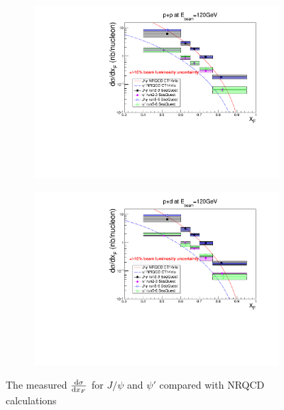 \documentclass[twocolumn,aps,unsortedaddress,superscriptaddress,prd,floatfix,showpacs,linenumbers]{revtex4-2}
\begin{document}
\begin{figure}
	\begin{subfigure}{0.45\linewidth}
		\includegraphics[width=\linewidth]{figures/crossSections/xF/combine_xF_LH2_5-6_5770_psip}
	\end{subfigure}
	\begin{subfigure}{0.45\linewidth}
		\includegraphics[width=\linewidth]{figures/crossSections/xF/combine_xF_LD2_5-6_5770_psip}
	\end{subfigure}
	\caption{The measured $\dv{\sigma}{x_F}$ for $J/\psi$ and $\psi'$ compared with NRQCD calculations}
	\label{fig:xF_cross_sections}
\end{figure}
\end{document}
